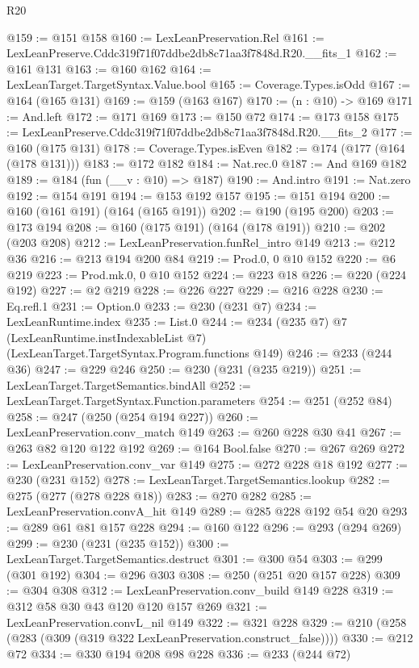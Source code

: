 \begin{lexlean}{R20}
\begin{coremodule}
@159 := @151 @158
@160 := LexLeanPreservation.Rel
@161 := LexLeanPreserve.Cddc319f71f07ddbe2db8c71aa3f7848d.R20.__fits_1
@162 := @161 @131
@163 := @160 @162
@164 := LexLeanTarget.TargetSyntax.Value.bool
@165 := Coverage.Types.isOdd
@167 := @164 (@165 @131)
@169 := @159 (@163 @167)
@170 := (n : @10) -> @169
@171 := And.left
@172 := @171 @169
@173 := @150 @72
@174 := @173 @158
@175 := LexLeanPreserve.Cddc319f71f07ddbe2db8c71aa3f7848d.R20.__fits_2
@177 := @160 (@175 @131)
@178 := Coverage.Types.isEven
@182 := @174 (@177 (@164 (@178 @131)))
@183 := @172 @182
@184 := Nat.rec.{0}
@187 := And @169 @182
@189 := @184 (fun (__v : @10) => @187)
@190 := And.intro
@191 := Nat.zero
@192 := @154 @191
@194 := @153 @192 @157
@195 := @151 @194
@200 := @160 (@161 @191) (@164 (@165 @191))
@202 := @190 (@195 @200)
@203 := @173 @194
@208 := @160 (@175 @191) (@164 (@178 @191))
@210 := @202 (@203 @208)
@212 := LexLeanPreservation.funRel_intro @149
@213 := @212 @36
@216 := @213 @194 @200 @84
@219 := Prod.{0, 0} @10 @152
@220 := @6 @219
@223 := Prod.mk.{0, 0} @10 @152
@224 := @223 @18
@226 := @220 (@224 @192)
@227 := @2 @219
@228 := @226 @227
@229 := @216 @228
@230 := Eq.refl.{1}
@231 := Option.{0}
@233 := @230 (@231 @7)
@234 := LexLeanRuntime.index
@235 := List.{0}
@244 := @234
    (@235 @7)
    @7
    (LexLeanRuntime.instIndexableList @7)
    (LexLeanTarget.TargetSyntax.Program.functions @149)
@246 := @233 (@244 @36)
@247 := @229 @246
@250 := @230 (@231 (@235 @219))
@251 := LexLeanTarget.TargetSemantics.bindAll
@252 := LexLeanTarget.TargetSyntax.Function.parameters
@254 := @251 (@252 @84)
@258 := @247 (@250 (@254 @194 @227))
@260 := LexLeanPreservation.conv_match @149
@263 := @260 @228 @30 @41
@267 := @263 @82 @120 @122 @192
@269 := @164 Bool.false
@270 := @267 @269
@272 := LexLeanPreservation.conv_var @149
@275 := @272 @228 @18 @192
@277 := @230 (@231 @152)
@278 := LexLeanTarget.TargetSemantics.lookup
@282 := @275 (@277 (@278 @228 @18))
@283 := @270 @282
@285 := LexLeanPreservation.convA_hit @149
@289 := @285 @228 @192 @54 @20
@293 := @289 @61 @81 @157 @228
@294 := @160 @122
@296 := @293 (@294 @269)
@299 := @230 (@231 (@235 @152))
@300 := LexLeanTarget.TargetSemantics.destruct
@301 := @300 @54
@303 := @299 (@301 @192)
@304 := @296 @303
@308 := @250 (@251 @20 @157 @228)
@309 := @304 @308
@312 := LexLeanPreservation.conv_build @149 @228
@319 := @312 @58 @30 @43 @120 @120 @157 @269
@321 := LexLeanPreservation.convL_nil @149
@322 := @321 @228
@329 := @210 (@258 (@283 (@309 (@319 @322 LexLeanPreservation.construct_false))))
@330 := @212 @72
@334 := @330 @194 @208 @98 @228
@336 := @233 (@244 @72)

\end{coremodule}
\end{lexlean}
